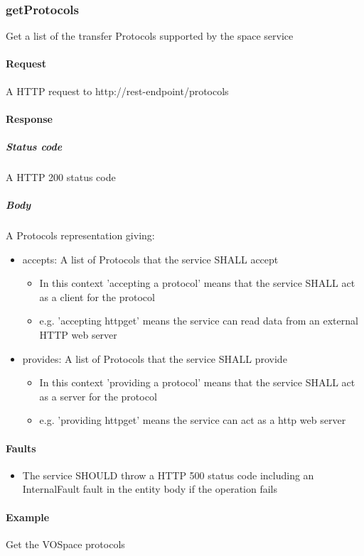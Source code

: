 \documentclass[11pt,a4paper]{ivoa}
\begin{document}
\subsubsection{getProtocols}
Get a list of the transfer Protocols supported by the space service

\paragraph{Request}
A HTTP request to http://rest-endpoint/protocols

\paragraph{Response}
\subparagraph{Status code} A HTTP 200 status code
\subparagraph{Body}
A Protocols representation giving:
\begin{itemize}
    \item accepts: A list of Protocols that the service SHALL accept
    \begin{itemize}
        \item In this context 'accepting a protocol' means that the service SHALL act as a client for the protocol
        \item e.g. 'accepting httpget' means the service can read data from an external HTTP web server
    \end{itemize}
    \item provides: A list of Protocols that the service SHALL provide
    \begin{itemize}
        \item In this context 'providing a protocol' means that the service SHALL act as a server for the protocol
        \item e.g. 'providing httpget' means the service can act as a http web server
    \end{itemize}
\end{itemize}

\paragraph{Faults}
\begin{itemize}
    \item The service SHOULD throw a HTTP 500 status code including an InternalFault fault in the entity body if the operation fails
\end{itemize}

\paragraph{Example}
Get the VOSpace protocols
\end{document}
